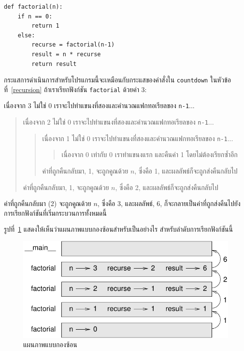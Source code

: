 \begin{verbatim}
def factorial(n):
    if n == 0:
        return 1
    else:
        recurse = factorial(n-1)
        result = n * recurse
        return result
\end{verbatim}
%
กระแสการดำเนินการสำหรับโปรแกรมนี้จะเหมือนกับกระแสของคำสั่งใน {\tt countdown} ในหัวข้อที่~\ref{recursion} 
ถ้าเราเรียกฟังก์ชัน {\tt factorial} ด้วยค่า 3:

เนื่องจาก 3 ไม่ใช่ 0 เราจะไปทำแขนงที่สองและคำนวณแฟกทอเรียลของ {\tt n-1}...

\begin{quote}
เนื่องจาก 2 ไม่ใช่ 0 เราจะไปทำแขนงที่สองและคำนวณแฟกทอเรียลของ {\tt n-1}...

  \begin{quote}
  เนื่องจาก 1 ไม่ใช่ 0 เราจะไปทำแขนงที่สองและคำนวณแฟกทอเรียลของ {\tt n-1}...

    \begin{quote}
    เนื่องจาก 0 เท่ากับ 0 เราทำแขนงแรก และคืนค่า 1 โดยไม่ต้องเรียกซ้ำอีก
    \end{quote}

  ค่าที่ถูกคืนกลับมา, 1, จะถูกคูณด้วย $n$, ซึ่งคือ 1, และผลลัพธ์ก็จะถูกส่งคืนกลับไป
  \end{quote}

ค่าที่ถูกคืนกลับมา, 1, จะถูกคูณด้วย $n$, ซึ่งคือ 2, และผลลัพธ์ก็จะถูกส่งคืนกลับไป
\end{quote}

ค่าที่ถูกคืนกลับมา (2) จะถูกคูณด้วย $n$, ซึ่งคือ 3, และผลลัพธ์, 6, ก็จะกลายเป็นค่าที่ถูกส่งคืนไปยัง
การเรียกฟังก์ชันที่เริ่มกระบวนการทั้งหมดนี้

รูปที่~\ref{fig.stack3} แสดงให้เห็นว่าแผนภาพแบบกองซ้อนสำหรับเป็นอย่างไร สำหรับลำดับการเรียกฟังก์ชันนี้

\begin{figure}
\centerline
{\includegraphics[scale=0.8]{figs/stack3.pdf}}
\caption{แผนภาพแบบกองซ้อน}
\label{fig.stack3}
\end{figure}

